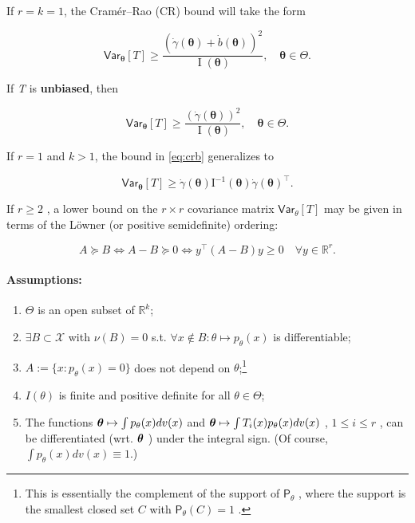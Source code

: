 If \(r = k = 1\), the Cram\'er--Rao (CR) bound will take the form

\[
	\mathsf{Var}_{\boldsymbol{\theta}}[T] \ge \frac{\left(\dot{\gamma}(\boldsymbol{\theta}) + \dot{b}(\boldsymbol{\theta})\right)^2}{\operatorname{I}(\boldsymbol{\theta})}, \quad \boldsymbol{\theta} \in \Theta.
\]

If \emph{T} is \textbf{unbiased}, then

\begin{equation}
	\label{eq:crb}
	\mathsf{Var}_{\boldsymbol{\theta}}[T] \ge \frac{\left(\dot{\gamma}(\boldsymbol{\theta})\right)^2}{\operatorname{I}(\boldsymbol{\theta})}, \quad \boldsymbol{\theta} \in \Theta.
\end{equation}

If \(r = 1\) and \(k>1\), the bound in \eqref{eq:crb} generalizes to

\[
	\mathsf{Var}_{\boldsymbol{\theta}}[T] \ge \dot{\gamma}(\boldsymbol{\theta}) \mathrm{I}^{-1}(\boldsymbol{\theta}) \dot{\gamma}(\boldsymbol{\theta})^{\top}.
\]

If \(r \ge 2\) , a lower bound on the \(r \times r\) covariance matrix
\(\mathsf{Var}_{\theta}[T]\) may be given in terms of the Löwner (or
positive semidefinite) ordering:

\[
	A \succeq B \iff A - B \succeq 0 \iff y^{\top}(A - B)y \geq 0 \quad \forall y \in \mathbb{R}^r.
\]

\paragraph{Assumptions:}%
\label{par:Assumptions}
\begin{enumerate}[label=(M\arabic*), ref=(M\arabic*)]
    \item\label{m1} \(\Theta\) is an open subset of \(\mathbb{R}^k\);
    \item \label{m2}\(\exists B \subset \mathcal{X}\) with \(\nu(B) = 0\) s.t.
	      \(\forall x \notin B : \theta \mapsto p_{\theta}(x)\) is differentiable;
      \item\label{m3} \(A := \{x : p_{\theta}(x) = 0\}\) does not depend on \(\theta\);\footnote{
        This is essentially the complement of the support
of \(\mathsf{P}_{\theta}\) , where the support is the smallest closed set \(C\) with
\(\mathsf{P}_{\theta}(C) = 1\) .}
\item\label{m4} \(I(\theta)\) is finite and positive definite for all
	      \(\theta \in \Theta\);
      \item \label{m5}The functions \(\boldsymbol{\theta} \mapsto \int p_{\theta}(x) dv(x)\) and
	      \(\boldsymbol{\theta} \mapsto \int T_i(x) p_{\theta}(x) dv(x)\) , \(1 \le i \le r\) ,
	      can be differentiated (wrt. \(\boldsymbol{\theta}\) ) under the integral sign. (Of
	      course, \(\int p_{\theta}(x) dv(x) \equiv 1\).)
\end{enumerate}

